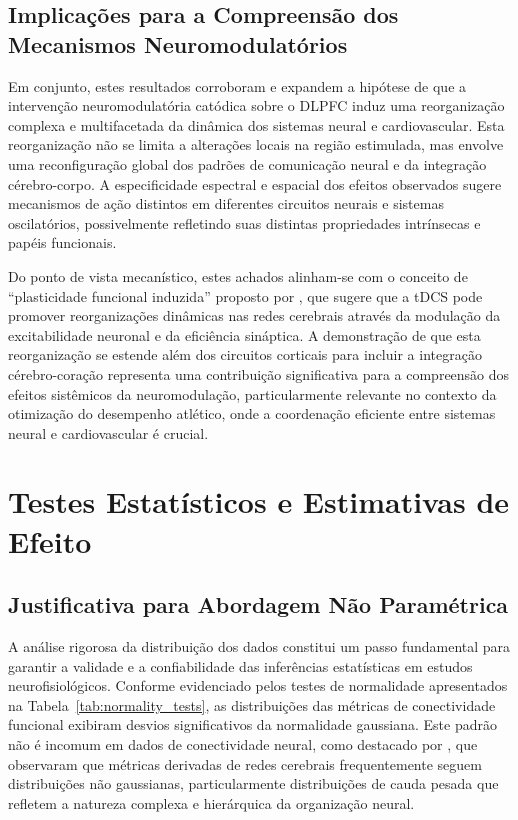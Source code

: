 \subsection{Implicações para a Compreensão dos Mecanismos Neuromodulatórios}
Em conjunto, estes resultados corroboram e expandem a hipótese de que a intervenção neuromodulatória catódica sobre o DLPFC induz uma reorganização complexa e multifacetada da dinâmica dos sistemas neural e cardiovascular. Esta reorganização não se limita a alterações locais na região estimulada, mas envolve uma reconfiguração global dos padrões de comunicação neural e da integração cérebro-corpo. A especificidade espectral e espacial dos efeitos observados sugere mecanismos de ação distintos em diferentes circuitos neurais e sistemas oscilatórios, possivelmente refletindo suas distintas propriedades intrínsecas e papéis funcionais.

Do ponto de vista mecanístico, estes achados alinham-se com o conceito de ``plasticidade funcional induzida'' proposto por \cite{kunze2014high}, que sugere que a tDCS pode promover reorganizações dinâmicas nas redes cerebrais através da modulação da excitabilidade neuronal e da eficiência sináptica. A demonstração de que esta reorganização se estende além dos circuitos corticais para incluir a integração cérebro-coração representa uma contribuição significativa para a compreensão dos efeitos sistêmicos da neuromodulação, particularmente relevante no contexto da otimização do desempenho atlético, onde a coordenação eficiente entre sistemas neural e cardiovascular é crucial.

\section{Testes Estatísticos e Estimativas de Efeito}

\subsection{Justificativa para Abordagem Não Paramétrica}
A análise rigorosa da distribuição dos dados constitui um passo fundamental para garantir a validade e a confiabilidade das inferências estatísticas em estudos neurofisiológicos. Conforme evidenciado pelos testes de normalidade apresentados na Tabela~\ref{tab:normality_tests}, as distribuições das métricas de conectividade funcional exibiram desvios significativos da normalidade gaussiana. Este padrão não é incomum em dados de conectividade neural, como destacado por \cite{bullmore2009complex}, que observaram que métricas derivadas de redes cerebrais frequentemente seguem distribuições não gaussianas, particularmente distribuições de cauda pesada que refletem a natureza complexa e hierárquica da organização neural.

